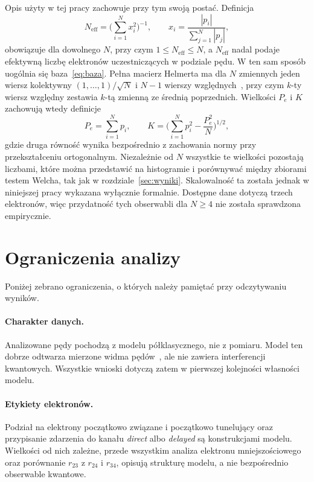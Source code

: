 \documentclass[12pt,a4paper]{article}
\newcommand{\Neff}{N_{\mathrm{eff}}}
\begin{document}
Opis użyty w tej pracy zachowuje przy tym swoją postać. Definicja
\begin{equation}
\Neff=\Big(\sum_{i=1}^{N}x_i^2\Big)^{-1},\qquad
x_i=\frac{|p_i|}{\sum_{j=1}^{N}|p_j|},
\label{eq:NeffN}
\end{equation}
obowiązuje dla dowolnego $N$, przy czym $1\le\Neff\le N$, a $\Neff$
nadal podaje efektywną liczbę elektronów uczestniczących w podziale
pędu. W ten sam sposób uogólnia się baza~\eqref{eq:baza}. Pełna
macierz Helmerta ma dla $N$ zmiennych jeden wiersz kolektywny
$(1,\dots,1)/\sqrt{N}$ i $N-1$ wierszy względnych~\cite{Lancaster1965},
przy czym $k$-ty wiersz względny zestawia $k$-tą zmienną ze średnią
poprzednich. Wielkości $P_e$ i $K$ zachowują wtedy definicje
\begin{equation}
P_e=\sum_{i=1}^{N}p_i,\qquad
K=\Big(\sum_{i=1}^{N}p_i^2-\frac{P_e^2}{N}\Big)^{1/2},
\label{eq:KN}
\end{equation}
gdzie druga równość wynika bezpośrednio z zachowania normy przy
przekształceniu ortogonalnym. Niezależnie od $N$ wszystkie te
wielkości pozostają liczbami, które można przedstawić na histogramie
i porównywać między zbiorami testem Welcha, tak jak w
rozdziale~\ref{sec:wyniki}.
Skalowalność ta została jednak w niniejszej pracy wykazana wyłącznie
formalnie. Dostępne dane dotyczą trzech elektronów, więc przydatność
tych obserwabli dla $N\ge4$ nie została sprawdzona empirycznie.


\section{Ograniczenia analizy}
\label{sec:ograniczenia}

Poniżej zebrano ograniczenia, o których należy pamiętać przy
odczytywaniu wyników.

\paragraph{Charakter danych.} Analizowane pędy pochodzą z modelu
półklasycznego, nie z pomiaru. Model ten dobrze odtwarza mierzone widma
pędów~\cite{Emmanouilidou2023}, ale nie zawiera interferencji
kwantowych. Wszystkie wnioski dotyczą zatem w pierwszej kolejności
własności modelu.

\paragraph{Etykiety elektronów.} Podział na elektrony początkowo
związane i początkowo tunelujący oraz przypisanie zdarzenia do
kanału \emph{direct} albo \emph{delayed} są konstrukcjami modelu.
Wielkości od nich zależne, przede wszystkim analiza elektronu
mniejszościowego oraz porównanie $r_{23}$ z $r_{24}$ i $r_{34}$, opisują
strukturę modelu, a nie bezpośrednio obserwable kwantowe.
\end{document}
